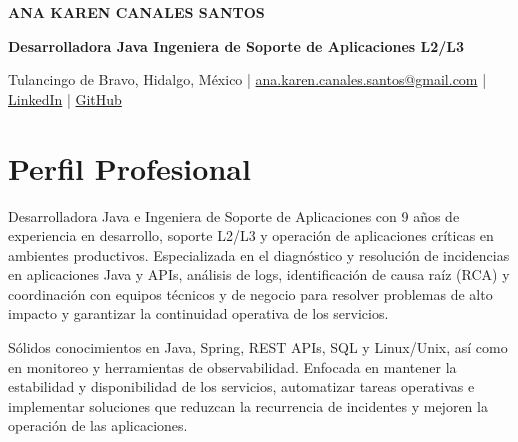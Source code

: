 \documentclass[10pt,letterpaper]{article}
\begin{document}

\begin{center}

    {\fontsize{24}{28}\selectfont
    \bfseries\color{NavyBlue}
    ANA KAREN CANALES SANTOS}

    \vspace{3pt}

    {\large
    \bfseries
    Desarrolladora Java \textbar{} Ingeniera de Soporte de Aplicaciones
    \textbar{} L2/L3}

    \vspace{5pt}

    \small
Tulancingo de Bravo, Hidalgo, México
\quad | \quad
\href{mailto:ana.karen.canales.santos@gmail.com}{ana.karen.canales.santos@gmail.com}
\quad | \quad
\href{https://www.linkedin.com/in/anakarencanalessantos/}{LinkedIn}
\quad | \quad
\href{https://github.com/iHannahBeZombie}{GitHub}

\end{center}


\section{Perfil Profesional}

Desarrolladora Java e Ingeniera de Soporte de Aplicaciones con 9 años de experiencia en desarrollo, soporte L2/L3 y operación de aplicaciones críticas en ambientes productivos. Especializada en el diagnóstico y resolución de incidencias en aplicaciones Java y APIs, análisis de logs, identificación de causa raíz (RCA) y coordinación con equipos técnicos y de negocio para resolver problemas de alto impacto y garantizar la continuidad operativa de los servicios.

Sólidos conocimientos en Java, Spring, REST APIs, SQL y Linux/Unix, así como en monitoreo y herramientas de observabilidad. Enfocada en mantener la estabilidad y disponibilidad de los servicios, automatizar tareas operativas e implementar soluciones que reduzcan la recurrencia de incidentes y mejoren la operación de las aplicaciones.

\end{document}
